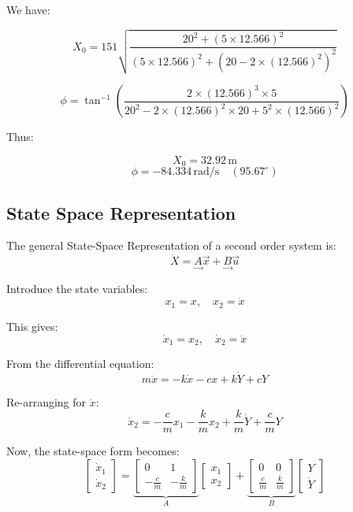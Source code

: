 \documentclass[12pt,a4paper]{article}
\begin{document}
{\vspace{5pt}}

We have:

\[
X_0 = 151 \sqrt{ \frac{20^2 + (5 \times 12.566)^2}{(5 \times 12.566)^2 + (20 - 2 \times (12.566)^2)^2} }
\]

\[
\phi = \tan^{-1}\left( \frac{2 \times (12.566)^3 \times 5}{20^2 - 2 \times (12.566)^2 \times 20 + 5^2 \times (12.566)^2} \right)
\]

{\vspace{5pt}}

Thus:

\[
X_0 = 32.92 \, \text{m}
\]
\[
\phi = -84.334 \, \text{rad/s} \quad (95.67^\circ)
\]

{\vspace{5pt}}

\subsection{State Space Representation}
The general State-Space Representation of a second order system is:
\[
\dot{X} = \underset{\rightarrow}{A}\vec{x} + \underset{\rightarrow}{B}\vec{u}
\]

Introduce the state variables:
\[
x_1 = x, \quad x_2 = \dot{x}
\]

This gives:
\[
\dot{x}_1 = x_2, \quad \dot{x}_2 = \ddot{x}
\]

From the differential equation:
\[
m\ddot{x} = -k\dot{x} - cx + k\dot{Y} + cY
\]

Re-arranging for \( \ddot{x} \):
\[
\dot{x}_2 = -\frac{c}{m}x_1 - \frac{k}{m}x_2 + \frac{k}{m}\dot{Y} + \frac{c}{m}Y
\]

Now, the state-space form becomes:
\[
\begin{bmatrix}
\dot{x}_1 \\
\dot{x}_2
\end{bmatrix}
=
\underbrace{
\begin{bmatrix}
0 & 1 \\
-\frac{c}{m} & -\frac{k}{m}
\end{bmatrix}}_{A}
\begin{bmatrix}
x_1 \\
x_2
\end{bmatrix}
+
\underbrace{
\begin{bmatrix}
0 & 0 \\
\frac{c}{m} & \frac{k}{m}
\end{bmatrix}}_{B}
\begin{bmatrix}
Y \\
\dot{Y}
\end{bmatrix}
\]
\end{document}
